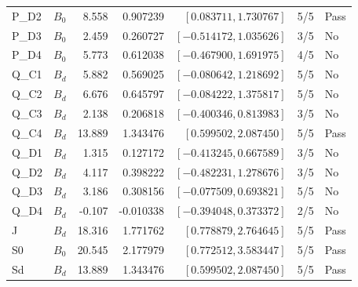 \begin{longtable}{llrrrrl}
P\_D2 & $B_0$ & 8.558 & 0.907239 & $[0.083711, 1.730767]$ & 5/5 & Pass\\
P\_D3 & $B_0$ & 2.459 & 0.260727 & $[-0.514172, 1.035626]$ & 3/5 & No\\
P\_D4 & $B_0$ & 5.773 & 0.612038 & $[-0.467900, 1.691975]$ & 4/5 & No\\
Q\_C1 & $B_d$ & 5.882 & 0.569025 & $[-0.080642, 1.218692]$ & 5/5 & No\\
Q\_C2 & $B_d$ & 6.676 & 0.645797 & $[-0.084222, 1.375817]$ & 5/5 & No\\
Q\_C3 & $B_d$ & 2.138 & 0.206818 & $[-0.400346, 0.813983]$ & 3/5 & No\\
Q\_C4 & $B_d$ & 13.889 & 1.343476 & $[0.599502, 2.087450]$ & 5/5 & Pass\\
Q\_D1 & $B_d$ & 1.315 & 0.127172 & $[-0.413245, 0.667589]$ & 3/5 & No\\
Q\_D2 & $B_d$ & 4.117 & 0.398222 & $[-0.482231, 1.278676]$ & 3/5 & No\\
Q\_D3 & $B_d$ & 3.186 & 0.308156 & $[-0.077509, 0.693821]$ & 5/5 & No\\
Q\_D4 & $B_d$ & -0.107 & -0.010338 & $[-0.394048, 0.373372]$ & 2/5 & No\\
J & $B_d$ & 18.316 & 1.771762 & $[0.778879, 2.764645]$ & 5/5 & Pass\\
S0 & $B_0$ & 20.545 & 2.177979 & $[0.772512, 3.583447]$ & 5/5 & Pass\\
Sd & $B_d$ & 13.889 & 1.343476 & $[0.599502, 2.087450]$ & 5/5 & Pass\\
\bottomrule\end{longtable}\normalsize
